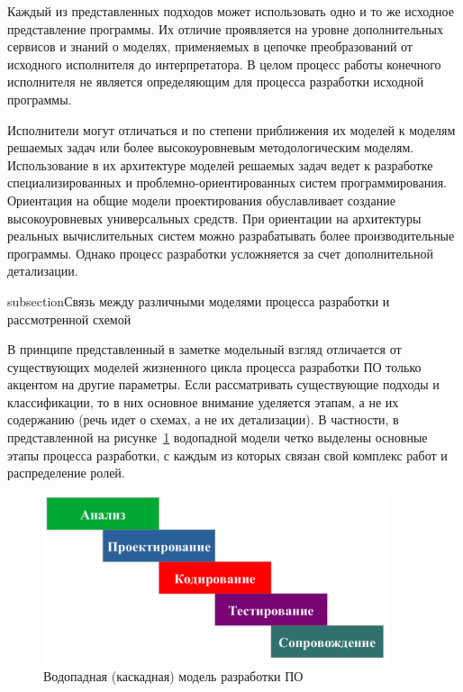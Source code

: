 Каждый из представленных подходов может использовать одно и то же исходное представление программы. Их отличие проявляется на уровне дополнительных сервисов и знаний о моделях, применяемых в цепочке преобразований от исходного исполнителя до интерпретатора. В целом процесс работы конечного исполнителя не является определяющим для процесса разработки исходной программы.

Исполнители могут отличаться и по степени приближения их моделей к моделям решаемых задач или более высокоуровневым методологическим моделям. Использование в их архитектуре моделей решаемых задач ведет к разработке специализированных и проблемно-ориентированных систем программирования. Ориентация на общие модели проектирования обуславливает создание высокоуровневых универсальных средств. При ориентации на архитектуры реальных вычислительных систем можно разрабатывать более производительные программы. Однако процесс разработки усложняется за счет дополнительной детализации.


subsection{Связь между различными моделями процесса разработки и рассмотренной схемой}

В принципе представленный в заметке модельный взгляд отличается от существующих моделей жизненного цикла процесса разработки ПО только акцентом на другие параметры. Если рассматривать существующие подходы и классификации, то в них основное внимание уделяется этапам, а не их содержанию (речь идет о схемах, а не их детализации). В частности, в представленной на рисунке~\ref{fdiag06} водопадной модели четко выделены основные этапы процесса разработки, с каждым из которых связан свой комплекс работ и распределение ролей.

\begin{figure}[htbp]
    \centering
    \includegraphics[width=0.9\textwidth]{img/fdiag06.png}
    \caption{Водопадная (каскадная) модель разработки ПО}
    \label{fdiag06}
\end{figure}

